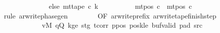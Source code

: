 \begin{isabellebody}
\ \ \ \ \ \ \ \ \ \ \ \ \ \ else\ mt{\isacharunderscore}{\kern0pt}tape\ c{}\ k{\isacharparenright}{\kern0pt}\isanewline
\ \ \ \ \ \ \ \ \ {\isasymand}\ mt{\isacharunderscore}{\kern0pt}pos\ c\ {\isacharequal}{\kern0pt}\ mt{\isacharunderscore}{\kern0pt}pos\ c{}{\isachardoublequoteclose}\isanewline
%
\isadelimproof
\ \ %
\endisadelimproof
%
\isatagproof
{}\isamarkupfalse%
\ {\isacharparenleft}{\kern0pt}rule\ ar{\isacharunderscore}{\kern0pt}write{\isacharunderscore}{\kern0pt}phase{\isacharunderscore}{\kern0pt}gen\isanewline
\ \ \ \ \ \ \ \ {\isacharbrackleft}{\kern0pt}OF\ ar{\isacharunderscore}{\kern0pt}write{\isacharunderscore}{\kern0pt}prefix\ ar{\isacharunderscore}{\kern0pt}write{\isacharunderscore}{\kern0pt}tape{\isacharunderscore}{\kern0pt}finish{\isacharunderscore}{\kern0pt}step\isanewline
\ \ \ \ \ \ \ \ \ \ \ \ vM\ qQ\ kge{}\ stg{}\ tcorr\ ppos\ poskle\ buf{\isacharunderscore}{\kern0pt}valid\ pad{}\ src{}{\isacharbrackright}{\kern0pt}{\isacharparenright}{\kern0pt}%
\endisatagproof
{\isafoldproof}%
%
\isadelimproof
\isanewline
%
\endisadelimproof
%
\isadelimtheory
\isanewline
%
\endisadelimtheory
%
\isatagtheory
{}\isamarkupfalse%
%
\endisatagtheory
{\isafoldtheory}%
%
\isadelimtheory
%
\endisadelimtheory
%
\end{isabellebody}%
\endinput
